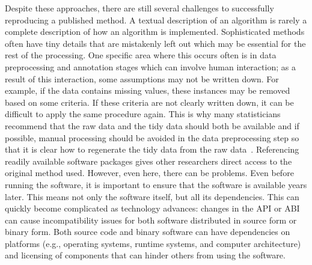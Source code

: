 Despite these approaches, there are still several challenges to successfully
reproducing a published method.
{ %
	A textual description of an algorithm is rarely a complete description of
	how an algorithm is implemented. Sophisticated methods often have tiny details
	that are mistakenly left out which may be essential for the rest of the
	processing. One specific area where this occurs often is
	in data preprocessing and annotation stages which can
	involve human interaction; as a result of this
	interaction, some assumptions
	may not be written down. For example, if the data contains
	missing values, these instances may be removed based on
	some criteria. If these criteria are not clearly written
	down, it can be difficult to apply the same procedure
	again. This is why many statisticians recommend that the
	raw data and the tidy data should both be available and if
	possible, manual processing should be avoided in the data
	preprocessing step so that it is clear how to regenerate the
	tidy data from the raw data~\autocite{Sandve2013,datasharing:Leek,Jaffe2015,Wickham:tidy-data}.
}
{ %
	Referencing readily available software packages gives
	other researchers direct access to the original method
	used. However, even here, there can be problems.
	Even before running the software, it is important to
	ensure that the
	software is available years later. This means not only the software itself, but
	all its dependencies. This can quickly become complicated as technology
	advances: changes in the \acrfull{API} or \acrfull{ABI}
	can cause incompatibility issues for both software
	distributed in source form or binary form. Both source
	code and binary software can have dependencies on
	platforms (e.g., operating systems, runtime systems, and computer
	architecture) and licensing of components that can
	hinder others from using the software.
}

